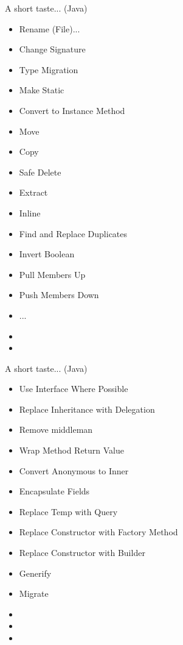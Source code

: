\documentclass{beamer}
\begin{document}
\begin{frame}{A short taste... (Java)}
\begin{multicols}{3}
\begin{itemize}
	\item Rename (File)...
	\item Change Signature
	\item Type Migration
	\item Make Static
	\item Convert to Instance Method
	\item Move
	\item Copy
	\item Safe Delete
	\item Extract
	\item Inline
	\item Find and Replace Duplicates
	\item Invert Boolean
	\item Pull Members Up
	\item Push Members Down
	\item ...
	\item 
	\item 
\end{itemize}
\end{multicols}
\end{frame}

\begin{frame}{A short taste... (Java)}
\begin{multicols}{3}
\begin{itemize}
	\item Use Interface Where Possible
	\item Replace Inheritance with Delegation
	\item Remove middleman
	\item Wrap Method Return Value
	\item Convert Anonymous to Inner
	\item Encapsulate Fields
	\item Replace Temp with Query
	\item Replace Constructor with Factory Method
	\item Replace Constructor with Builder 
	\item Generify
	\item Migrate
	\item 
	\item 
	\item 
\end{itemize}
\end{multicols}
\end{frame}
\end{document}
